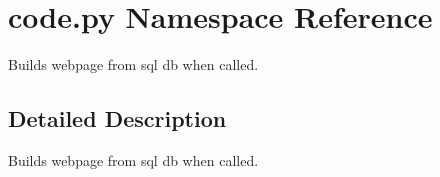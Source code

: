 \hypertarget{namespacecode_1_1py}{\section{code.\-py Namespace Reference}
\label{namespacecode_1_1py}
}


Builds webpage from sql db when called.  




\subsection{Detailed Description}
Builds webpage from sql db when called. 